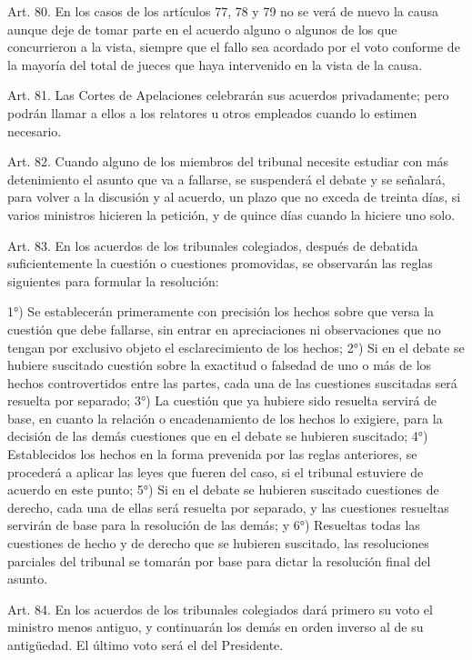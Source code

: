     Art. 80. En los casos de los artículos 77, 78 y 79 no se verá de nuevo la causa aunque deje de tomar parte en el acuerdo alguno o algunos de los que concurrieron a la vista, siempre que el fallo sea acordado por el voto conforme de la mayoría del total de jueces que haya intervenido en la vista de la causa.


    Art. 81. Las Cortes de Apelaciones celebrarán sus acuerdos privadamente; pero podrán llamar a ellos a los relatores u otros empleados cuando lo estimen necesario.


    Art. 82. Cuando alguno de los miembros del tribunal necesite estudiar con más detenimiento el asunto que va a fallarse, se suspenderá el debate y se señalará, para volver a la discusión y al acuerdo, un plazo que no exceda de treinta días, si varios ministros hicieren la petición, y de quince días cuando la hiciere uno solo.
   


    Art. 83. En los acuerdos de los tribunales colegiados, después de debatida suficientemente la cuestión o cuestiones promovidas, se observarán las reglas siguientes para formular la resolución:

    1°) Se establecerán primeramente con precisión los hechos sobre que versa la cuestión que debe fallarse, sin entrar en apreciaciones ni observaciones que no tengan por exclusivo objeto el esclarecimiento de los hechos;
    2°) Si en el debate se hubiere suscitado cuestión sobre la exactitud o falsedad de uno o más de los hechos controvertidos entre las partes, cada una de las cuestiones suscitadas será resuelta por separado;
    3°) La cuestión que ya hubiere sido resuelta servirá de base, en cuanto la relación o encadenamiento de los hechos lo exigiere, para la decisión de las demás cuestiones que en el debate se hubieren suscitado;
    4°) Establecidos los hechos en la forma prevenida por las reglas anteriores, se procederá a aplicar las leyes que fueren del caso, si el tribunal estuviere de acuerdo en este punto;
    5°) Si en el debate se hubieren suscitado cuestiones de derecho, cada una de ellas será resuelta por separado, y las cuestiones resueltas servirán de base para la resolución de las demás; y
    6°) Resueltas todas las cuestiones de hecho y de derecho que se hubieren suscitado, las resoluciones parciales del tribunal se tomarán por base para dictar la resolución final del asunto.

    Art. 84. En los acuerdos de los tribunales colegiados dará primero su voto el ministro menos antiguo, y continuarán los demás en orden inverso al de su antigüedad. El último voto será el del Presidente.

